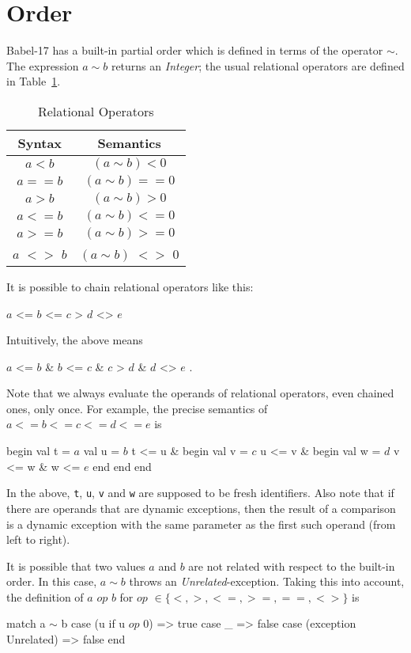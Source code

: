 \documentclass[11pt]{amsart}
\newcommand{\metababel}[1] {\textsl{#1}}
\newcommand{\babelsrc}[1] {\lstinline!#1!}
\begin{document}
\section{Order}\label{sec:order}
Babel-17 has a built-in partial order which is defined in terms of the operator $\sim$. The expression $a \sim b$ returns an \metababel{Integer}; the usual relational  operators are defined in Table~\ref{tab:relops}.
\begin{table}
\caption{Relational Operators}
\begin{tabular}{c|c}
\textbf{Syntax} & \textbf{Semantics} \\\hline
$a < b$ & $(a \sim b) < 0$\\
$a == b$ & $(a \sim b) == 0$\\
$a > b$ & $(a \sim b) > 0$ \\
$a <= b$ &  $(a \sim b) <= 0$ \\
$a >= b$ & $(a \sim b) >= 0$ \\
$a$ $<>$ $b$ & $(a \sim b)$ $<>$ $0$ \\
\end{tabular}
\label{tab:relops}
\end{table}

It is possible to chain relational operators like this:
\begin{babellisting}
$a$ <= $b$ <= $c$ > $d$ <> $e$ 
\end{babellisting}
Intuitively, the above means 
\begin{babellisting}
$a$ <= $b$ & $b$ <= $c$  & $c$ > $d$  & $d$ <> $e$ .
\end{babellisting}
Note that  we always evaluate the operands  of relational operators, even chained ones, only once. For example, the precise semantics of $a <= b <= c <= d <= e$ is 
\begin{babellisting}
begin
  val t = $a$
  val u = $b$
  t <= u &
  begin
    val v = $c$
    u <= v & 
    begin
      val w = $d$
      v <= w & w <= $e$
    end
  end
end
\end{babellisting}
In the above, \babelsrc{t}, \babelsrc{u}, \babelsrc{v} and \babelsrc{w} are supposed to be fresh identifiers.  Also note that if there are operands that are dynamic exceptions, then the result of a comparison is a dynamic exception with the same parameter as the first such operand (from left to right).

It is possible that two values $a$ and $b$ are not related with respect to the built-in order. In this case, $a \sim b$ throws an \emph{Unrelated}-exception. Taking this into account, the definition of $a$ $op$ $b$ for $op$ $\in \{<, >, <=, >=, ==, <>\}$ is
\begin{babellisting}
match a $\sim$ b 
  case (u if u $op$ 0) => true
  case _ => false
  case (exception Unrelated) => false
end
\end{babellisting}
\end{document}
